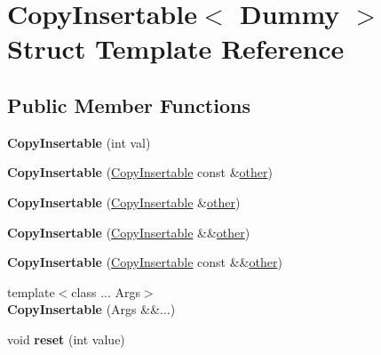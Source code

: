 \hypertarget{struct_copy_insertable}{}\section{Copy\+Insertable$<$ Dummy $>$ Struct Template Reference}
\label{struct_copy_insertable}
\subsection*{Public Member Functions}
\begin{DoxyCompactItemize}
\item 
\mbox{\label{struct_copy_insertable_a3471dcc69ba209e9934e69441f2a23b2}} 
{\bfseries Copy\+Insertable} (int val)
\item 
\mbox{\label{struct_copy_insertable_a1e4c1df873c4d85ac022ec459e332cf1}} 
{\bfseries Copy\+Insertable} (\mbox{\hyperlink{struct_copy_insertable}{Copy\+Insertable}} const \&\mbox{\hyperlink{structother}{other}})
\item 
\mbox{\label{struct_copy_insertable_a7ce02528e26b7f50213653bb993bd938}} 
{\bfseries Copy\+Insertable} (\mbox{\hyperlink{struct_copy_insertable}{Copy\+Insertable}} \&\mbox{\hyperlink{structother}{other}})
\item 
\mbox{\label{struct_copy_insertable_aadaeb06b67cc61e8f7d04c95ba298f89}} 
{\bfseries Copy\+Insertable} (\mbox{\hyperlink{struct_copy_insertable}{Copy\+Insertable}} \&\&\mbox{\hyperlink{structother}{other}})
\item 
\mbox{\label{struct_copy_insertable_aa9e4788d5336206fbc94489e75664003}} 
{\bfseries Copy\+Insertable} (\mbox{\hyperlink{struct_copy_insertable}{Copy\+Insertable}} const \&\&\mbox{\hyperlink{structother}{other}})
\item 
\mbox{\label{struct_copy_insertable_adbe4b9fbfcf8b42475a692e657b4c200}} 
{\footnotesize template$<$class ... Args$>$ }\\{\bfseries Copy\+Insertable} (Args \&\&...)
\item 
\mbox{\label{struct_copy_insertable_aa789a040d8ed55e9da526bb41dbf5778}} 
void {\bfseries reset} (int value)
\end{DoxyCompactItemize}
